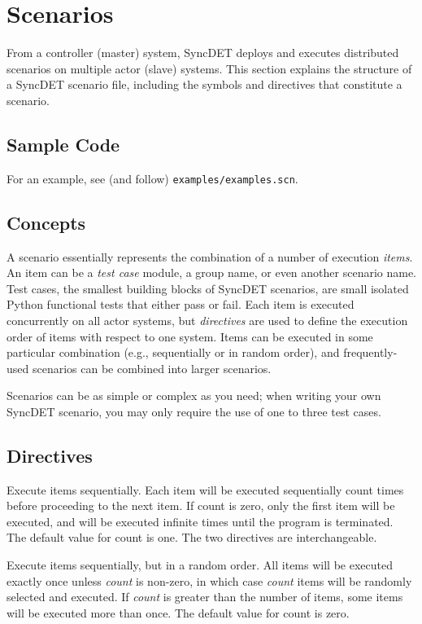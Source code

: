 \section{Scenarios}

From a controller (master) system, SyncDET deploys and executes distributed
scenarios on multiple actor (slave) systems. This section explains the structure
of a SyncDET scenario file, including the symbols and directives that constitute
a scenario.

\subsection{Sample Code}
For an example, see (and follow) {\tt examples/examples.scn}.

\subsection{Concepts}
A scenario essentially represents the combination of a number of execution {\em
items}. An item can be a {\em test case} module, a group name, or even another
scenario name. Test cases, the smallest building blocks of SyncDET scenarios,
are small isolated Python functional tests that either pass or fail. Each item
is executed concurrently on all actor systems, but {\em directives} are used to
define the execution order of items with respect to one system.  Items can be
executed in some particular combination (e.g., sequentially or in random order),
and frequently-used scenarios can be combined into larger scenarios.

Scenarios can be as simple or complex as you need; when writing your own SyncDET
scenario, you may only require the use of one to three test cases.

\subsection{Directives}

Execute items sequentially. Each item will be executed sequentially count times
before proceeding to the next item. If count is zero, only the first item will
be executed, and will be executed infinite times until the program is
terminated. The default value for count is one. The two directives are
interchangeable.

Execute items sequentially, but in a random order. All items will be executed
exactly once unless {\it count} is non-zero, in which case {\it count} items
will be randomly selected and executed. If {\it count} is greater than the
number of items, some items will be executed more than once. The default value
for count is zero.


